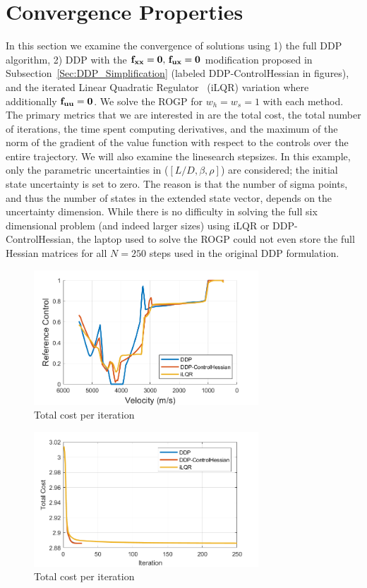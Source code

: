 \section{Convergence Properties}\label{Sec:ConvergenceProperties}
In this section we examine the convergence of solutions using 1) the full DDP algorithm, 2) DDP with the $\mathbf{f}_{\mathbf{x}\mathbf{x}}=\mathbf{0},\, \mathbf{f}_{\mathbf{u}\mathbf{x}}=\mathbf{0}$ modification proposed in Subsection~\ref{Sec:DDP_Simplification} (labeled DDP-ControlHessian in figures), and the iterated Linear Quadratic Regulator~\cite{iLQG} (iLQR) variation where additionally $\mathbf{f}_{\mathbf{u}\mathbf{u}}=\mathbf{0}$. We solve the ROGP for $w_h=w_s=1$ with each method. The primary metrics that we are interested in are the total cost, the total number of iterations, the time spent computing derivatives, and the maximum of the norm of the gradient of the value function with respect to the controls over the entire trajectory. We will also examine the linesearch stepsizes. In this example, only the parametric uncertainties in ($[L/D,\beta,\rho]$) are considered; the initial state uncertainty is set to zero. The reason is that the number of sigma points, and thus the number of states in the extended state vector, depends on the uncertainty dimension. While there is no difficulty in solving the full six dimensional problem (and indeed larger sizes) using iLQR or DDP-ControlHessian, the laptop used to solve the ROGP could not even store the full Hessian matrices for all $N=250$ steps used in the original DDP formulation.
\begin{figure}[h!]
	\centering
	\includegraphics[width=0.75\textwidth]{Images/Convergence/ControlProfiles}
	\caption{Total cost per iteration}
	\label{Fig:ConvergeControls}
\end{figure}
\begin{figure}[h!]
	\centering
	\includegraphics[width=0.75\textwidth]{Images/Convergence/cost}
	\caption{Total cost per iteration}
	\label{Fig:ConvergeCost}
\end{figure}
